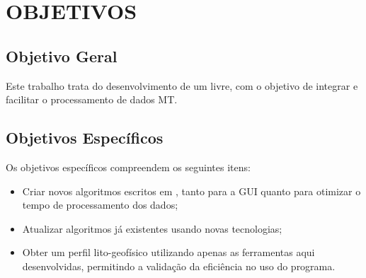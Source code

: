 \chapter{OBJETIVOS}

	\section{Objetivo Geral}
        Este trabalho trata do desenvolvimento de um  livre, com o objetivo de integrar e facilitar o processamento de dados MT.
    
    \section{Objetivos Específicos}
        
        Os objetivos específicos compreendem os seguintes itens:
        
        \begin{itemize}
            \item Criar novos algoritmos escritos em \Python, tanto para a GUI quanto para otimizar o tempo de processamento dos dados;
            \item Atualizar algoritmos já existentes usando novas tecnologias;
            \item Obter um perfil lito-geofísico utilizando apenas as ferramentas aqui desenvolvidas, permitindo a validação da eficiência no uso do programa.
        \end{itemize}
